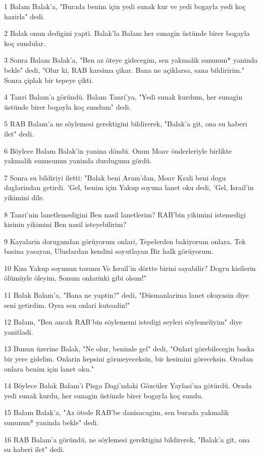 \par 1 Balam Balak'a, "Burada benim için yedi sunak kur ve yedi bogayla yedi koç hazirla" dedi.
\par 2 Balak onun dedigini yapti. Balak'la Balam her sunagin üstünde birer bogayla koç sundular.
\par 3 Sonra Balam Balak'a, "Ben az öteye gidecegim, sen yakmalik sununun* yaninda bekle" dedi, "Olur ki, RAB karsima çikar. Bana ne açiklarsa, sana bildiririm." Sonra çiplak bir tepeye çikti.
\par 4 Tanri Balam'a göründü. Balam Tanri'ya, "Yedi sunak kurdum, her sunagin üstünde birer bogayla koç sundum" dedi.
\par 5 RAB Balam'a ne söylemesi gerektigini bildirerek, "Balak'a git, ona su haberi ilet" dedi.
\par 6 Böylece Balam Balak'in yanina döndü. Onun Moav önderleriyle birlikte yakmalik sunusunun yaninda durdugunu gördü.
\par 7 Sonra su bildiriyi iletti: "Balak beni Aram'dan, Moav Krali beni dogu daglarindan getirdi. 'Gel, benim için Yakup soyuna lanet oku dedi, 'Gel, Israil'in yikimini dile.
\par 8 Tanri'nin lanetlemedigini Ben nasil lanetlerim? RAB'bin yikimini istemedigi kisinin yikimini Ben nasil isteyebilirim?
\par 9 Kayalarin dorugundan görüyorum onlari, Tepelerden bakiyorum onlara. Tek basina yasayan, Uluslardan kendini soyutlayan Bir halk görüyorum.
\par 10 Kim Yakup soyunun tozunu Ve Israil'in dörtte birini sayabilir? Dogru kisilerin ölümüyle öleyim, Sonum onlarinki gibi olsun!"
\par 11 Balak Balam'a, "Bana ne yaptin?" dedi, "Düsmanlarima lanet okuyasin diye seni getirdim. Oysa sen onlari kutsadin!"
\par 12 Balam, "Ben ancak RAB'bin söylememi istedigi seyleri söylemeliyim" diye yanitladi.
\par 13 Bunun üzerine Balak, "Ne olur, benimle gel" dedi, "Onlari görebilecegin baska bir yere gidelim. Onlarin hepsini görmeyeceksin, bir kesimini göreceksin. Oradan onlara benim için lanet oku."
\par 14 Böylece Balak Balam'i Pisga Dagi'ndaki Gözcüler Yaylasi'na götürdü. Orada yedi sunak kurdu, her sunagin üstünde birer bogayla koç sundu.
\par 15 Balam Balak'a, "Az ötede RAB'be danisacagim, sen burada yakmalik sununun* yaninda bekle" dedi.
\par 16 RAB Balam'a göründü, ne söylemesi gerektigini bildirerek, "Balak'a git, ona su haberi ilet" dedi.

